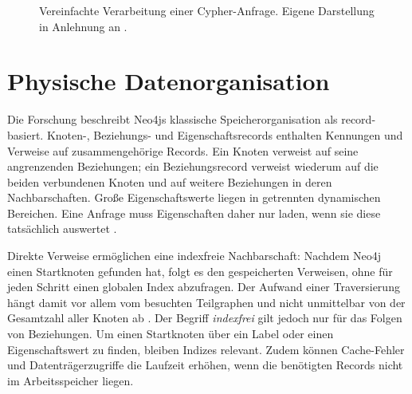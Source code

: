 \begin{figure}[htbp]
	\centering
	\caption{Vereinfachte Verarbeitung einer Cypher-Anfrage. Eigene Darstellung in Anlehnung an \cite{neo4j2026queryplans}.}
	\label{fig:query-processing}
\end{figure}

\section{Physische Datenorganisation}

Die Forschung beschreibt Neo4js klassische Speicherorganisation als record-basiert. Knoten-, Beziehungs- und Eigenschaftsrecords enthalten Kennungen und Verweise auf zusammengehörige Records. Ein Knoten verweist auf seine angrenzenden Beziehungen; ein Beziehungsrecord verweist wiederum auf die beiden verbundenen Knoten und auf weitere Beziehungen in deren Nachbarschaften. Große Eigenschaftswerte liegen in getrennten dynamischen Bereichen. Eine Anfrage muss Eigenschaften daher nur laden, wenn sie diese tatsächlich auswertet \cite{besta2023demystifying}.

Direkte Verweise ermöglichen eine indexfreie Nachbarschaft: Nachdem Neo4j einen Startknoten gefunden hat, folgt es den gespeicherten Verweisen, ohne für jeden Schritt einen globalen Index abzufragen. Der Aufwand einer Traversierung hängt damit vor allem vom besuchten Teilgraphen und nicht unmittelbar von der Gesamtzahl aller Knoten ab \cite{besta2023demystifying}. Der Begriff \emph{indexfrei} gilt jedoch nur für das Folgen von Beziehungen. Um einen Startknoten über ein Label oder einen Eigenschaftswert zu finden, bleiben Indizes relevant. Zudem können Cache-Fehler und Datenträgerzugriffe die Laufzeit erhöhen, wenn die benötigten Records nicht im Arbeitsspeicher liegen.


